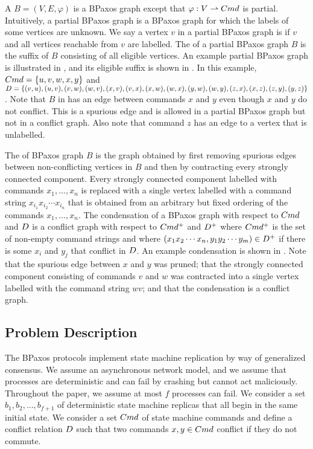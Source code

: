 A  $B = (V, E, \varphi)$ is a BPaxos graph except
that $\varphi: V \rightharpoonup Cmd$ is partial. Intuitively, a partial BPaxos
graph is a BPaxos graph for which the labels of some vertices are unknown.
%
We say a vertex $v$ in a partial BPaxos graph is  if $v$ and
all vertices reachable from $v$ are labelled. The  of
a partial BPaxos graph $B$ is the suffix of $B$ consisting of all eligible
vertices.
%
An example partial BPaxos graph is illustrated in ,
and its eligible suffix is shown in . In this example,
$Cmd = \{u, v, w, x, y\}$ and
  $D = \{
    (v, u), (u, v),
    (v, w), (w, v),
    (x, v), (v, x),
    (x, w), (w, x),
    (y, w), (w, y),
    (z, x), (x, z),
    (z, y), (y, z)
  \}$.
Note that $B$ in  has an edge between commands $x$
and $y$ even though $x$ and $y$ do not conflict. This is a spurious edge and is
allowed in a partial BPaxos graph but not in a conflict graph. Also note that
command $z$ has an edge to a vertex that is unlabelled.



The  of BPaxos graph $B$ is the graph obtained by first
removing spurious edges between non-conflicting vertices in $B$ and then by
contracting every strongly connected component. Every strongly connected
component labelled with commands $x_1, \ldots, x_n$ is replaced with a single
vertex labelled with a command string $x_{i_1} x_{i_2} \cdots x_{i_n}$ that is
obtained from an arbitrary but fixed ordering of the commands $x_1, \ldots,
x_n$.
%
The condensation of a BPaxos graph with respect to $Cmd$ and $D$ is
a conflict graph with respect to $Cmd^+$ and $D^+$ where $Cmd^+$ is
the set of non-empty command strings and where $(x_1 x_2 \cdots x_n, y_1 y_2
\cdots y_m) \in D^+$ if there is some $x_i$ and $y_j$ that conflict in
$D$.
%
An example condensation is shown in . Note that the
spurious edge between $x$ and $y$ was pruned; that the strongly connected
component consisting of commands $v$ and $w$ was contracted into a single
vertex labelled with the command string $wv$; and that the condensation is a
conflict graph.

\subsection{Problem Description}
The BPaxos protocols implement state machine replication by way of generalized
consensus. We assume an asynchronous network model, and we assume that
processes are deterministic and can fail by crashing but cannot act
maliciously. Throughout the paper, we assume at most $f$ processes can fail. We
consider a set $b_1, b_2, \ldots, b_{f+1}$ of deterministic state machine
replicas that all begin in the same initial state. We consider a set $Cmd$ of
state machine commands and define a conflict relation $D$ such that two
commands $x, y \in Cmd$ conflict if they do not commute.

